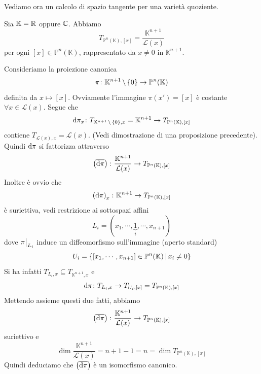 \documentclass[a4paper]{article}
\begin{document}
Vediamo ora un calcolo di spazio tangente per una varietà quoziente.

\begin{snippetproposition}{}
    Sia \(\mathbb K = \mathbb{R}\) oppure \(\mathbb{C}\). Abbiamo
    \[
        T_{\mathbb P^n(\mathbb K), [x]} = \frac{{\mathbb K}^{n+1}}{
            \mathcal L(x)
        }
    \]
    per ogni \([x] \in \mathbb P^n(\mathbb K)\), rappresentato da \(x \neq 0\)
    in \(\mathbb K^{n+1}\).
\end{snippetproposition}

\begin{snippetproof}{}
    Consideriamo la proiezione canonica
    \[
        \pi \colon \mathbb K^{n+1} \,\backslash\, \{0\}
        \to \mathbb P^n(\mathbb K)
    \]
    definita da \(x \mapsto [x]\). Ovviamente l'immagine
    \(\pi(x')=[x]\) è costante \(\forall x \in \mathcal L(x)\).
    Segue che
    \[
        \text d\pi_x \colon T_{\mathbb K^{n+1} \,\backslash\, \{0\}, x}
        = \mathbb K^{n+1} \to T_{\mathbb P^n(\mathbb K), [x]}
    \]
    contiene \(T_{\mathcal L(x), x} = \mathcal L(x)\).
    (Vedi dimostrazione di una proposizione precedente).
    Quindi \(\text d\pi\) si fattorizza attraverso
    \[
        \left(\overline{\text d\pi}\right) \colon
        \frac{\mathbb K^{n+1}}{\mathcal L(x)} \to T_{\mathbb P^n(\mathbb K), [x]}
    \]
    Inoltre è ovvio che \[
        \left(
            \text d\pi
        \right)_x \colon \mathbb K^{n+1} \to T_{\mathbb P^n(\mathbb K), [x]}
    \]
    è suriettiva, vedi restrizione ai sottospazi affini
    \[
        L_i = (x_1, \cdots, \underbrace 1_i, \cdots, x_{n+1})
    \]
    dove \(\restr{\pi}{L_i}\) induce un diffeomorfismo sull'immagine
    (aperto standard) \[
        U_i = \{
            [x_1, \cdots, x_{n+1}] \in \mathbb P^n(\mathbb K)
            \,|\, x_i \neq 0    
        \}
    \]
    Si ha infatti \(T_{L_i, x} \subseteq T_{\mathbb K^{n+1}, x}\) e \[
        \text d\pi \colon T_{L_i, x} \to T_{U_i,[x]} = T_{\mathbb P^n(\mathbb K), [x]}
    \]
    Mettendo assieme questi due fatti, abbiamo
    \[
        \left(\overline{\text d\pi}\right) \colon
        \frac{\mathbb K^{n+1}}{\mathcal L(x)} \to T_{\mathbb P^n(\mathbb K), [x]}
    \]
    suriettivo
    e \[
        \dim \frac{\mathbb K^{n+1}}{\mathcal L(x)}
        = n+ 1 - 1 = n = \dim T_{\mathbb P^n(\mathbb K), [x]}
    \]
    Quindi deduciamo che \(\left(\overline{\text d\pi}\right)\)
    è un isomorfismo canonico.
\end{snippetproof}
\end{document}
